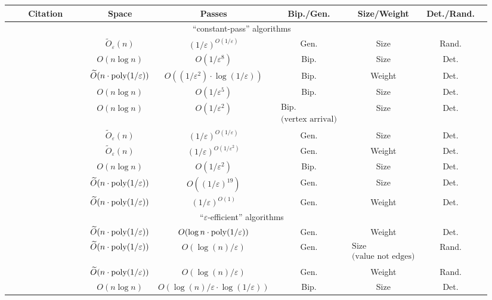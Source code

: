 \documentclass{theoretics}
\newcommand{\Ot}{\widetilde{O}}
\newcommand{\eps}{\varepsilon}
\newcommand{\poly}{\mbox{\rm poly}}
\begin{document}
\begin{table}[h!]
{\begin{tabular}{|c | c | c | c | c | c | c |}
 \hline
  ~~~~Citation~~~~ & ~~Space~~ & ~~~~Passes~~~~ & Bip./Gen. & Size/Weight & Det./Rand.  \\ 
  \hline\hline
  \multicolumn{6}{|c|}{``constant-pass'' algorithms} \\
  \hline\hline
  \cite{McGregor05} & $\Ot_{\eps}(n)$ & $(1/\eps)^{O(1/\eps)}$ & Gen. & Size & Rand.  \\
  \hline
  \cite{EggertKS09} & $O(n\log{n})$ & $O(1/\eps^{8})$ & Bip. & Size & Det.  \\
  \hline
  \cite{AhnG11} & $\Ot(n \cdot \poly{(1/\eps)})$ & $O((1/\eps^2) \cdot \log{(1/\eps)})$ & Bip. & Weight & Det. \\ 
  \hline
  \cite{EggertKMS12} & $O(n\log{n})$ & $O(1/\eps^{5})$  & Bip. & Size & Det. \\
  \hline
  \cite{Kapralov13} & $O(n\log{n})$ & $O(1/\eps^2)$ & {\large $\substack{\text{Bip.} \\ \text{(vertex arrival)}}$} & Size & Det. \\
  \hline
  \cite{Tirodkar18} & $\Ot_{\eps}(n)$ & $(1/\eps)^{O(1/\eps)}$ & Gen. & Size & Det. \\
  \hline
  \cite{GamlathKMS19} & $\Ot_{\eps}(n)$ & $(1/\eps)^{O(1/\eps^2)}$ & Gen. & Weight & Det. \\
  \hline
  \cite{AssadiLT21} & $O(n\log{n})$ & $O(1/\eps^2)$ & Bip. & Size & Det. \\
    \hline
  \cite{FischerMU22} & $\Ot(n \cdot \poly{(1/\eps)})$ & $O((1/\eps)^{19})$ & Gen. & Size & Det. \\
  \hline
  \cite{HuangS23} & $\Ot(n \cdot \poly{(1/\eps)})$ & ${(1/\eps)^{O(1)}}$  & Gen. & Weight & Det. \\
  \hline\hline
  \multicolumn{6}{|c|}{``$\eps$-efficient'' algorithms} \\
  \hline\hline
  \cite{AhnG11} & $\Ot(n \cdot \poly{(1/\eps)})$ & $O(\log{n} \cdot \poly{(1/\eps)})$ & Gen. & Weight & Det. \\
\hline
  \cite{AhnG11b} & $\Ot(n \cdot \poly{(1/\eps)})$ & $O(\log{\!(n)}/\eps)$ & Gen. & {\large $\substack{\text{Size} \\ \text{(value not edges)}}$} & Rand. \\
  \hline
  \cite{AhnG15} & $\Ot(n \cdot \poly{(1/\eps)})$ & $O(\log{\!(n)}/\eps)$ & Gen. & Weight & Rand. \\
  \hline
  \cite{AssadiJJST22} & $O(n\log{n})$ & $O(\log{\!(n)}/\eps \cdot \log{(1/\eps)})$ & Bip. & Size & Det. \\

\end{tabular}}
\end{table}
\end{document}
